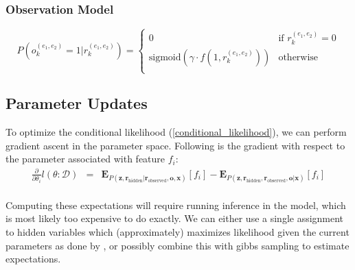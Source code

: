 \documentclass[12pt]{article}
\begin{document}
\subsubsection{Observation Model}
\[
P(o^{(e_1,e_2)}_k=1|r^{(e_1,e_2)}_k) = 
\left\{
\begin{array}{ll}
  0 & \mbox{if } r^{(e_1,e_2)}_k = 0 \\
  \text{sigmoid}\left(\gamma \cdot f(1,r^{(e_1,e_2)}_k)\right) & \mbox{otherwise }  \\
  \end{array}
\right.
\]

\subsection{Parameter Updates}
To optimize the conditional likelihood (\ref{conditional_likelihood}), we can perform gradient ascent in the parameter space.  Following is the gradient with respect
to the parameter associated with feature $f_i$:
\begin{eqnarray*}
  \frac{\partial}{\partial \theta_i} l(\theta:\mathcal{D}) & = & \mathbf{E}_{P(\mathbf{z},\mathbf{r}_{\text{hidden}}|\mathbf{r}_{\text{observed}}, \mathbf{o}, \mathbf{x})}[f_i] - \mathbf{E}_{P(\mathbf{z},\mathbf{r}_{\text{hidden}}, \mathbf{r}_{\text{observed}}, \mathbf{o} | \mathbf{x})}[f_i] \\
\end{eqnarray*}

Computing these expectations will require running inference in the model, which is most likely too expensive to do exactly.
We can either use a single assignment to hidden variables which (approximately) maximizes likelihood given the current parameters as done by \cite{Hoffmann11}, or possibly
combine this with gibbs sampling to estimate expectations.


\end{document}
